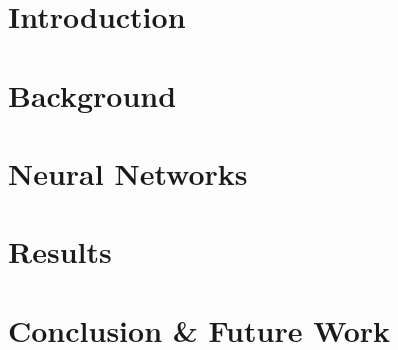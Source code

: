 


	
	\linenumbers
	\newpage
	\tableofcontents
	\newpage
	\section{Introduction}
	

	\section{Background}
	

	\section{Neural Networks}
	


	\newpage %
	\section{Results}
	

	\section{Conclusion \& Future Work}
	

	\newpage
	
	

